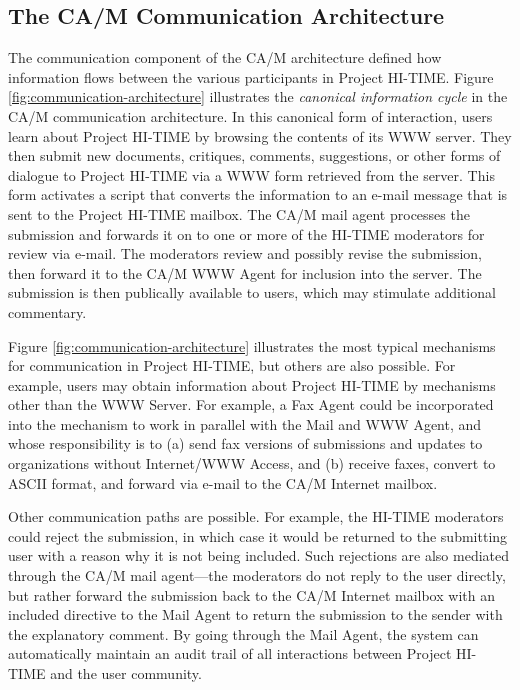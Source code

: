 \subsection{The CA/M Communication Architecture}

The communication component of the CA/M architecture defined how
information flows between the various participants in Project HI-TIME.
Figure \ref{fig:communication-architecture} illustrates the {\em canonical
  information cycle\/} in the CA/M communication architecture. In this
canonical form of interaction, users learn about Project HI-TIME by
browsing the contents of its WWW server.  They then submit new documents,
critiques, comments, suggestions, or other forms of dialogue to Project
HI-TIME via a WWW form retrieved from the server.  This form activates a
script that converts the information to an e-mail message that is sent to
the Project HI-TIME mailbox.  The CA/M mail agent processes the submission
and forwards it on to one or more of the HI-TIME moderators for review via
e-mail.  The moderators review and possibly revise the submission, then
forward it to the CA/M WWW Agent for inclusion into the server.  The
submission is then publically available to users, which may stimulate
additional commentary.


\begin{figure*}[htbp]
  \centerline{} 
\caption{The {\em canonical information cycle} in the CA/M Communication Architecture} 
\label{fig:communication-architecture}
\end{figure*}

Figure \ref{fig:communication-architecture} illustrates the most typical
mechanisms for communication in Project HI-TIME, but others are also
possible.  For example, users may obtain information about Project HI-TIME
by mechanisms other than the WWW Server.  For example, a Fax Agent could be
incorporated into the mechanism to work in parallel with the Mail and WWW
Agent, and whose responsibility is to (a) send fax versions of submissions
and updates to organizations without Internet/WWW Access, and (b) receive
faxes, convert to ASCII format, and forward via e-mail to the CA/M Internet
mailbox.

Other communication paths are possible. For example, 
the HI-TIME moderators could reject the submission, in which case it would be
returned to the submitting user with a reason why it is not being included.
Such rejections are also mediated through the CA/M mail agent---the
moderators do not reply to the user directly, but rather forward the
submission back to the CA/M Internet mailbox with an included directive to
the Mail Agent to return the submission to the sender with the explanatory
comment.  By going through the Mail Agent, the system can automatically
maintain an audit trail of all interactions between Project HI-TIME and the
user community.

